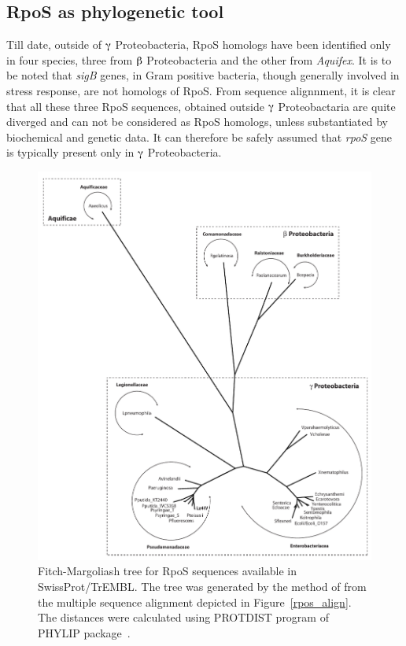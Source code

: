 \subsection{RpoS as phylogenetic tool}

Till date, outside of $\gammaup$ Proteobacteria, RpoS homologs
have been identified only in four species, three from $\betaup$
Proteobacteria and the other from \emph{Aquifex}. It is to be
noted that \emph{sigB} genes, in Gram positive bacteria, though
generally involved in stress response, are not homologs of RpoS.
From sequence alignnment, it is clear that all these three RpoS
sequences, obtained outside $\gammaup$ Proteobactaria are quite
diverged and can not be considered as RpoS homologs, unless
substantiated by biochemical and genetic data. It can therefore be
safely assumed that \emph{rpoS} gene is typically present only in
$\gammaup$ Proteobacteria.

\begin{figure}[tbp]
\begin{narrow}{-1.5in}{-1.5in}
\centering
\includegraphics{figures/chap4_dendrogram}
\end{narrow}
\caption[Phylogenetic tree of RpoS sequences]{Fitch-Margoliash
tree for RpoS sequences available in SwissProt/TrEMBL. The tree
was generated by the method of \citet{Fitch1967} from the multiple
sequence alignment depicted in Figure~\ref{rpos_align}. The
distances were calculated using PROTDIST program of PHYLIP
package~\citep{Fel1989}.} \label{tree}

\end{figure}


